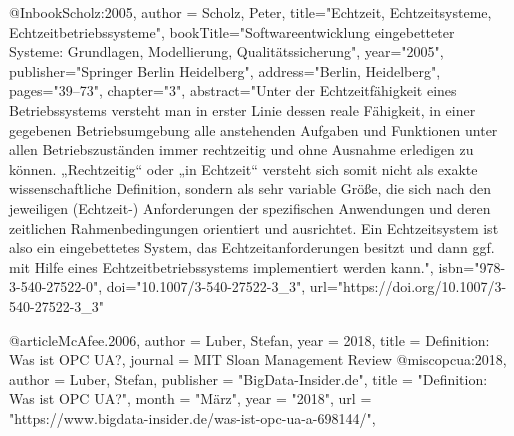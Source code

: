 @Inbook{Scholz:2005,
author = {Scholz, Peter},
title="Echtzeit, Echtzeitsysteme, Echtzeitbetriebssysteme",
bookTitle="Softwareentwicklung eingebetteter Systeme: Grundlagen, Modellierung, Qualit{\"a}tssicherung",
year="2005",
publisher="Springer Berlin Heidelberg",
address="Berlin, Heidelberg",
pages="39--73",
chapter="3",
abstract="Unter der Echtzeitf{\"a}higkeit eines Betriebssystems versteht man in erster Linie dessen reale F{\"a}higkeit, in einer gegebenen Betriebsumgebung alle anstehenden Aufgaben und Funktionen unter allen Betriebszust{\"a}nden immer rechtzeitig und ohne Ausnahme erledigen zu k{\"o}nnen. „Rechtzeitig`` oder „in Echtzeit`` versteht sich somit nicht als exakte wissenschaftliche Definition, sondern als sehr variable Gr{\"o}{\ss}e, die sich nach den jeweiligen (Echtzeit-) Anforderungen der spezifischen Anwendungen und deren zeitlichen Rahmenbedingungen orientiert und ausrichtet. Ein Echtzeitsystem ist also ein eingebettetes System, das Echtzeitanforderungen besitzt und dann ggf. mit Hilfe eines Echtzeitbetriebssystems implementiert werden kann.",
isbn="978-3-540-27522-0",
doi="10.1007/3-540-27522-3_3",
url="https://doi.org/10.1007/3-540-27522-3\_3"
}

@article{McAfee.2006,
 author = {Luber, Stefan},
 year = {2018},
 title = {Definition: Was ist OPC UA?},
 journal = {MIT Sloan Management Review}
}
@misc{opcua:2018,
  author = {Luber, Stefan},
  publisher = "BigData-Insider.de",
  title = "Definition: Was ist {OPC UA}?",
  month = "M{\"a}rz",
  year = "2018",
  url = "https://www.bigdata-insider.de/was-ist-opc-ua-a-698144/",
}